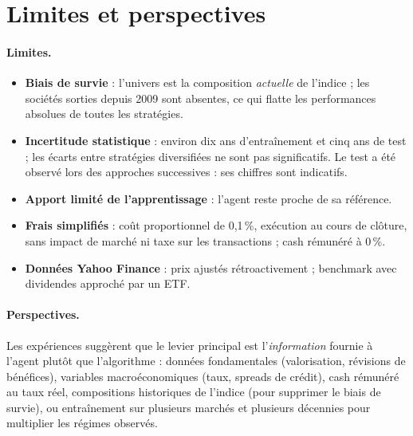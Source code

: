 \documentclass[11pt,a4paper]{article}
\begin{document}
\section{Limites et perspectives}\label{sec:limites}

\paragraph{Limites.}
\begin{itemize}
  \item \textbf{Biais de survie} : l'univers est la composition \emph{actuelle} de l'indice ; les sociétés
        sorties depuis 2009 sont absentes, ce qui flatte les performances absolues de toutes les stratégies.
  \item \textbf{Incertitude statistique} : environ dix ans d'entraînement et cinq ans de test ; les écarts entre
        stratégies diversifiées ne sont pas significatifs. Le test a été observé lors des approches successives :
        ses chiffres sont indicatifs.
  \item \textbf{Apport limité de l'apprentissage} : l'agent reste proche de sa référence.
  \item \textbf{Frais simplifiés} : coût proportionnel de 0,1\,\%, exécution au cours de clôture, sans impact de
        marché ni taxe sur les transactions ; cash rémunéré à 0\,\%.
  \item \textbf{Données Yahoo Finance} : prix ajustés rétroactivement ; benchmark avec dividendes approché par un ETF.
\end{itemize}

\paragraph{Perspectives.} Les expériences suggèrent que le levier principal est l'\emph{information} fournie à
l'agent plutôt que l'algorithme : données fondamentales (valorisation, révisions de bénéfices), variables
macroéconomiques (taux, spreads de crédit), cash rémunéré au taux réel, compositions historiques de l'indice
(pour supprimer le biais de survie), ou entraînement sur plusieurs marchés et plusieurs décennies pour
multiplier les régimes observés.

\end{document}
